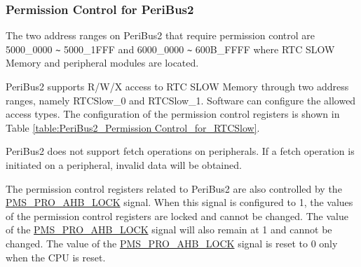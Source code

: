 \documentclass[main\_\_EN.tex]{subfiles}
\begin{document}
\subsubsection{Permission Control for PeriBus2}
The two address ranges on PeriBus2 that require permission control are \hexprefix{}5000\_0000 \verb+~+ \hexprefix{}5000\_1FFF and \hexprefix{}6000\_0000 \verb+~+ \hexprefix{}600B\_FFFF where RTC SLOW Memory and peripheral modules are located.

PeriBus2 supports R/W/X access to RTC SLOW Memory through two address ranges, namely RTCSlow\_0 and RTCSlow\_1. Software can configure the allowed access types. The configuration of the permission control registers is shown in Table \ref{table:PeriBus2_Permission Control_for_RTCSlow}.

PeriBus2 does not support fetch operations on peripherals. If a fetch operation is initiated on a peripheral, invalid data will be obtained.

The permission control registers related to PeriBus2 are also controlled by the \hyperref[fielddesc:PMSPROAHBLOCK]{PMS\_PRO\_AHB\_LOCK} signal. When this signal is configured to 1, the values of the permission control registers are locked and cannot be changed. The value of the \hyperref[fielddesc:PMSPROAHBLOCK]{PMS\_PRO\_AHB\_LOCK} signal will also remain at 1 and cannot be changed. The value of the \hyperref[fielddesc:PMSPROAHBLOCK]{PMS\_PRO\_AHB\_LOCK} signal is reset to 0 only when the CPU is reset.
\end{document}
